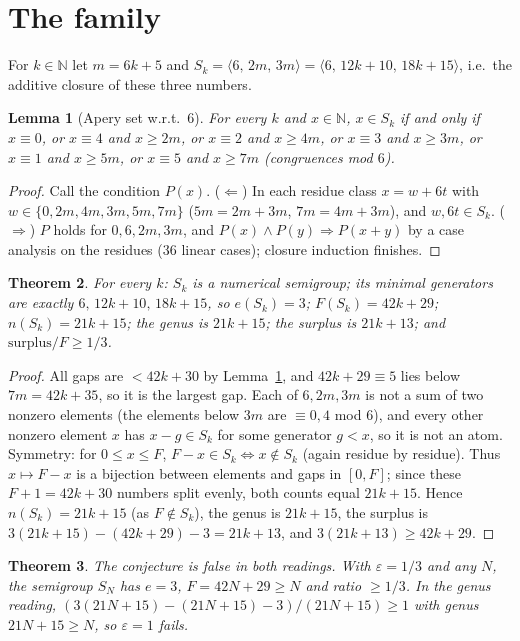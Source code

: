 \documentclass[11pt]{article}
\renewcommand{\_}{\oldus\allowbreak}
\newtheorem{theorem}{Theorem}
\newtheorem{lemma}[theorem]{Lemma}
\theoremstyle{definition}
\theoremstyle{remark}
\newcommand{\N}{\mathbb{N}}
\begin{document}
\section{The family}

For $k\in\N$ let $m=6k+5$ and $S_k=\langle 6,\,2m,\,3m\rangle=\langle 6,\,12k+10,\,18k+15\rangle$, i.e.\ the
additive closure of these three numbers.

\begin{lemma}[Apery set w.r.t.\ 6]\label{lem:apery}
For every $k$ and $x\in\N$, $x\in S_k$ if and only if
$x\equiv 0$, or $x\equiv 4$ and $x\ge 2m$, or $x\equiv 2$ and $x\ge 4m$, or $x\equiv 3$ and $x\ge 3m$, or
$x\equiv 1$ and $x\ge 5m$, or $x\equiv 5$ and $x\ge 7m$ (congruences mod $6$).
\end{lemma}
\begin{proof}
Call the condition $P(x)$. ($\Leftarrow$) In each residue class $x=w+6t$ with $w\in\{0,2m,4m,3m,5m,7m\}$
($5m=2m+3m$, $7m=4m+3m$), and $w,6t\in S_k$. ($\Rightarrow$) $P$ holds for $0,6,2m,3m$, and $P(x)\wedge P(y)
\Rightarrow P(x+y)$ by a case analysis on the residues ($36$ linear cases); closure induction finishes.
\end{proof}

\begin{theorem}\label{thm:main}
For every $k$: $S_k$ is a numerical semigroup; its minimal generators are exactly $6,\,12k+10,\,18k+15$, so
$e(S_k)=3$; $F(S_k)=42k+29$; $n(S_k)=21k+15$; the genus is $21k+15$; the surplus is $21k+13$; and
$\text{surplus}/F\ge 1/3$.
\end{theorem}
\begin{proof}
All gaps are $<42k+30$ by Lemma~\ref{lem:apery}, and $42k+29\equiv 5$ lies below $7m=42k+35$, so it is the
largest gap. Each of $6,2m,3m$ is not a sum of two nonzero elements (the elements below $3m$ are $\equiv 0,4$
mod 6), and every other nonzero element $x$ has $x-g\in S_k$ for some generator $g<x$, so it is not an atom.
Symmetry: for $0\le x\le F$, $F-x\in S_k\iff x\notin S_k$ (again residue by residue). Thus $x\mapsto F-x$ is
a bijection between elements and gaps in $[0,F]$; since these $F+1=42k+30$ numbers split evenly, both counts
equal $21k+15$. Hence $n(S_k)=21k+15$ (as $F\notin S_k$), the genus is $21k+15$, the surplus is
$3(21k+15)-(42k+29)-3=21k+13$, and $3(21k+13)\ge 42k+29$.
\end{proof}

\begin{theorem}
The conjecture is false in both readings. With $\varepsilon=1/3$ and any $N$, the semigroup $S_N$ has
$e=3$, $F=42N+29\ge N$ and ratio $\ge 1/3$. In the genus reading, $(3(21N+15)-(21N+15)-3)/(21N+15)\ge 1$
with genus $21N+15\ge N$, so $\varepsilon=1$ fails.
\end{theorem}
\end{document}
